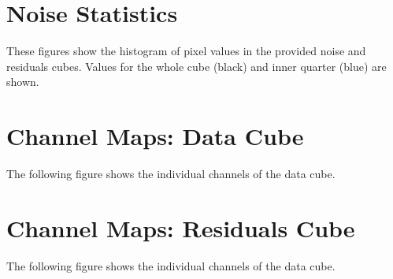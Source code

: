 \documentclass[11pt]{article}
\begin{document}
\section{Noise Statistics}
\label{sec:noise_stats}

\noindent These figures show the histogram of pixel values in the provided
noise and residuals cubes. Values for the whole cube (black) and inner quarter (blue) are shown. 





\section{Channel Maps: Data Cube}
\label{sect:channel_maps}

\noindent The following figure shows the individual channels of the data cube.\\


\section{Channel Maps: Residuals Cube}
\label{sect:channel_maps}

\noindent The following figure shows the individual channels of the data cube.\\

\end{document}
